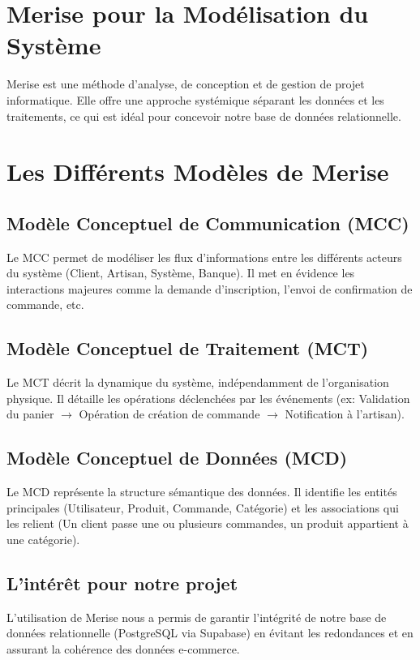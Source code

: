 \documentclass[12pt,a4paper]{report}
\begin{document}
\section{Merise pour la Modélisation du Système}
Merise est une méthode d'analyse, de conception et de gestion de projet informatique. Elle offre une approche systémique séparant les données et les traitements, ce qui est idéal pour concevoir notre base de données relationnelle.

\section{Les Différents Modèles de Merise}

\subsection{Modèle Conceptuel de Communication (MCC)}
Le MCC permet de modéliser les flux d'informations entre les différents acteurs du système (Client, Artisan, Système, Banque). Il met en évidence les interactions majeures comme la demande d'inscription, l'envoi de confirmation de commande, etc.

\subsection{Modèle Conceptuel de Traitement (MCT)}
Le MCT décrit la dynamique du système, indépendamment de l'organisation physique. Il détaille les opérations déclenchées par les événements (ex: Validation du panier $\rightarrow$ Opération de création de commande $\rightarrow$ Notification à l'artisan).

\subsection{Modèle Conceptuel de Données (MCD)}
Le MCD représente la structure sémantique des données. Il identifie les entités principales (Utilisateur, Produit, Commande, Catégorie) et les associations qui les relient (Un client passe une ou plusieurs commandes, un produit appartient à une catégorie).

\subsection{L’intérêt pour notre projet}
L'utilisation de Merise nous a permis de garantir l'intégrité de notre base de données relationnelle (PostgreSQL via Supabase) en évitant les redondances et en assurant la cohérence des données e-commerce.
\end{document}
